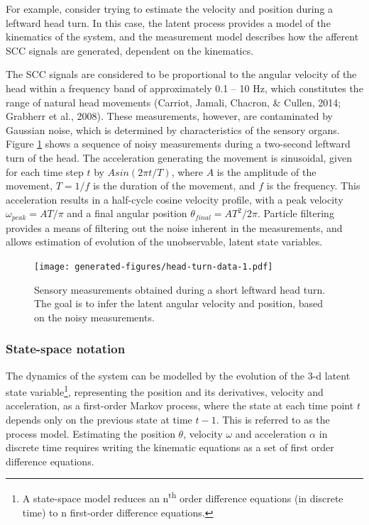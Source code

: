 \documentclass[english,floatsintext,man]{apa6}
\theoremstyle{definition}
\theoremstyle{definition}
\theoremstyle{remark}
\begin{document}
For example, consider trying to estimate the velocity and position
during a leftward head turn. In this case, the latent process provides a
model of the kinematics of the system, and the measurement model
describes how the afferent SCC signals are generated, dependent on the
kinematics.

The SCC signals are considered to be proportional to the angular
velocity of the head within a frequency band of approximately 0.1 -- 10
Hz, which constitutes the range of natural head movements (Carriot,
Jamali, Chacron, \& Cullen, 2014; Grabherr et al., 2008). These
measurements, however, are contaminated by Gaussian noise, which is
determined by characteristics of the sensory organs. Figure
\ref{fig:head-turn-data} shows a sequence of noisy measurements during a
two-second leftward turn of the head. The acceleration generating the
movement is sinusoidal, given for each time step \(t\) by
\(Asin(2\pi t/T)\), where \(A\) is the amplitude of the movement,
\(T = 1/f\) is the duration of the movement, and \(f\) is the frequency.
This acceleration results in a half-cycle cosine velocity profile, with
a peak velocity \(\omega_{peak} = AT/\pi\) and a final angular position
\(\theta_{final} = AT^2/2\pi\). Particle filtering provides a means of
filtering out the noise inherent in the measurements, and allows
estimation of evolution of the unobservable, latent state variables.

\begin{figure}
\centering
\texttt{[image: generated-figures/head-turn-data-1.pdf]}
\caption{\label{fig:head-turn-data}Sensory measurements obtained during a
short leftward head turn. The goal is to infer the latent angular
velocity and position, based on the noisy measurements.}
\end{figure}

\subsubsection{State-space notation}\label{state-space-notation}

The dynamics of the system can be modelled by the evolution of the 3-d
latent state variable\footnote{A state-space model reduces an
  n\textsuperscript{th} order difference equations (in discrete time) to
  n first-order difference equations.}, representing the position and
its derivatives, velocity and acceleration, as a first-order Markov
process, where the state at each time point \(t\) depends only on the
previous state at time \(t-1\). This is referred to as the process
model. Estimating the position \(\theta\), velocity \(\omega\) and
acceleration \(\alpha\) in discrete time requires writing the kinematic
equations as a set of first order difference equations.
\end{document}
